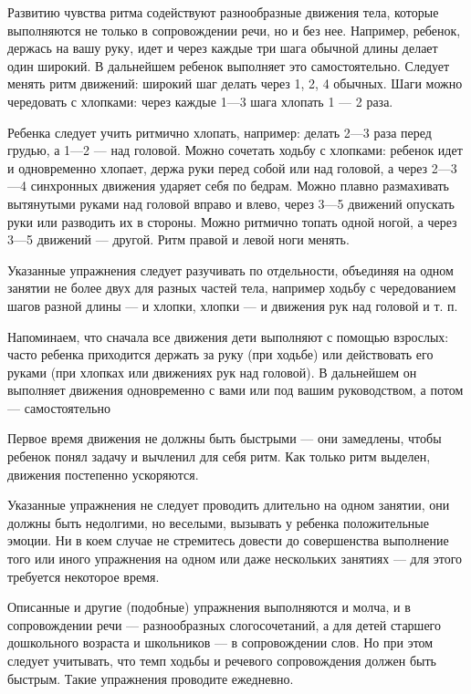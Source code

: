 \documentclass[a5paper]{book}
\begin{document}
Развитию чувства ритма содействуют разнообразные движения тела, которые
выполняются не только в сопровождении речи, но и без нее. Например,
ребенок, держась на вашу руку, идет и через каждые три шага обычной
длины делает один широкий. В дальнейшем ребенок выполняет это
самостоятельно. Следует менять ритм движений: широкий шаг делать через
1, 2, 4 обычных. Шаги можно чередовать с хлопками: через каждые 1---3
шага хлопать 1 --- 2 раза.

Ребенка следует учить ритмично хлопать, например: делать 2---3 раза
перед грудью, а 1---2 --- над головой. Можно сочетать ходьбу с хлопками:
ребенок идет и одновременно хлопает, держа руки перед собой или над
головой, а через 2---3---4 синхронных движения ударяет себя по бедрам.
Можно плавно размахивать вытянутыми руками над головой вправо и влево,
через 3---5 движений опускать руки или разводить их в стороны. Можно
ритмично топать одной ногой, а через 3---5 движений --- другой. Ритм
правой и левой ноги менять.

Указанные упражнения следует разучивать по отдельности, объединяя на
одном занятии не более двух для разных частей тела, например ходьбу с
чередованием шагов разной длины --- и хлопки, хлопки --- и движения рук
над головой и т. п.

Напоминаем, что сначала все движения дети выполняют с помощью взрослых:
часто ребенка приходится держать за руку (при ходьбе) или действовать
его руками (при хлопках или движениях рук над головой). В дальнейшем он
выполняет движения одновременно с вами или под вашим руководством, а
потом --- самостоятельно

Первое время движения не должны быть быстрыми --- они замедлены, чтобы
ребенок понял задачу и вычленил для себя ритм. Как только ритм выделен,
движения постепенно ускоряются.

Указанные упражнения не следует проводить длительно на одном занятии,
они должны быть недолгими, но веселыми, вызывать у ребенка положительные
эмоции. Ни в коем случае не стремитесь довести до совершенства
выполнение того или иного упражнения на одном или даже нескольких
занятиях --- для этого требуется некоторое время.

Описанные и другие (подобные) упражнения выполняются и молча, и в
сопровождении речи --- разнообразных слогосочетаний, а для детей
старшего дошкольного возраста и школьников --- в сопровождении слов. Но
при этом следует учитывать, что темп ходьбы и речевого сопровождения
должен быть быстрым. Такие упражнения проводите ежедневно.
\end{document}
